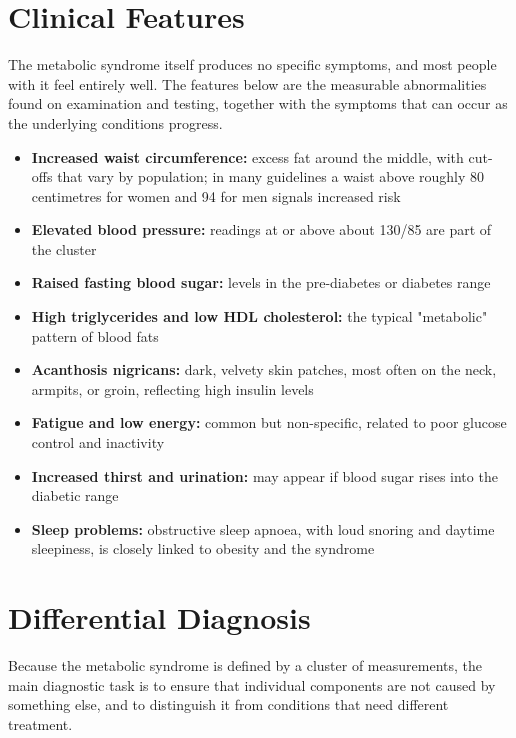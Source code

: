 \section*{Clinical Features}
The metabolic syndrome itself produces no specific symptoms, and most people with it feel entirely well. The features below are the measurable abnormalities found on examination and testing, together with the symptoms that can occur as the underlying conditions progress.

\begin{itemize}
    \item \textbf{Increased waist circumference:} excess fat around the middle, with cut-offs that vary by population; in many guidelines a waist above roughly 80 centimetres for women and 94 for men signals increased risk
    \item \textbf{Elevated blood pressure:} readings at or above about 130/85 are part of the cluster
    \item \textbf{Raised fasting blood sugar:} levels in the pre-diabetes or diabetes range
    \item \textbf{High triglycerides and low HDL cholesterol:} the typical "metabolic" pattern of blood fats
    \item \textbf{Acanthosis nigricans:} dark, velvety skin patches, most often on the neck, armpits, or groin, reflecting high insulin levels
    \item \textbf{Fatigue and low energy:} common but non-specific, related to poor glucose control and inactivity
    \item \textbf{Increased thirst and urination:} may appear if blood sugar rises into the diabetic range
    \item \textbf{Sleep problems:} obstructive sleep apnoea, with loud snoring and daytime sleepiness, is closely linked to obesity and the syndrome
\end{itemize}

\section*{Differential Diagnosis}
Because the metabolic syndrome is defined by a cluster of measurements, the main diagnostic task is to ensure that individual components are not caused by something else, and to distinguish it from conditions that need different treatment.

